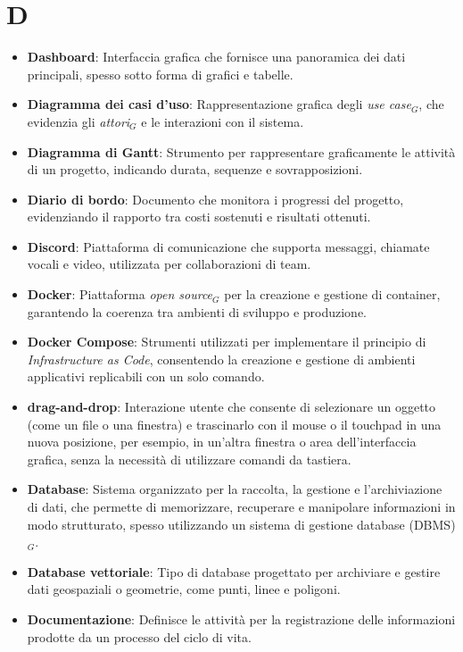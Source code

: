 \section{D}
\begin{itemize}
    \item \textbf{Dashboard}: Interfaccia grafica che fornisce una panoramica dei dati principali, spesso sotto forma di grafici e tabelle.
    \item \textbf{Diagramma dei casi d’uso}: Rappresentazione grafica degli \textit{use case}$_G$, che evidenzia gli \textit{attori}$_G$ e le interazioni con il sistema.
    \item \textbf{Diagramma di Gantt}: Strumento per rappresentare graficamente le attività di un progetto, indicando durata, sequenze e sovrapposizioni.
    \item \textbf{Diario di bordo}: Documento che monitora i progressi del progetto, evidenziando il rapporto tra costi sostenuti e risultati ottenuti.
    \item \textbf{Discord}: Piattaforma di comunicazione che supporta messaggi, chiamate vocali e video, utilizzata per collaborazioni di team.
    \item \textbf{Docker}: Piattaforma \textit{open source}$_G$ per la creazione e gestione di container, garantendo la coerenza tra ambienti di sviluppo e produzione.
    \item \textbf{Docker Compose}: Strumenti utilizzati per implementare il principio di \textit{Infrastructure as Code}, consentendo la creazione e gestione di ambienti applicativi replicabili con un solo comando.
    \item \textbf{drag-and-drop}: Interazione utente che consente di selezionare un oggetto (come un file o una finestra) e trascinarlo con il mouse o il touchpad in una nuova posizione, per esempio, in un'altra finestra o area dell'interfaccia grafica, senza la necessità di utilizzare comandi da tastiera.
    \item \textbf{Database}: Sistema organizzato per la raccolta, la gestione e l'archiviazione di dati, che permette di memorizzare, recuperare e manipolare informazioni in modo strutturato, spesso utilizzando un sistema di gestione database (DBMS)$_G$.
    \item \textbf{Database vettoriale}: Tipo di database progettato per archiviare e gestire dati geospaziali o geometrie, come punti, linee e poligoni.
    \item \textbf{Documentazione}: Definisce le attività per la registrazione delle informazioni prodotte da un processo del ciclo di vita.

\end{itemize}
